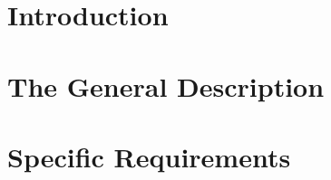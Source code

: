 \documentclass[12pt]{article}
\begin{document}

\begin{screen}
\ppttitle
\end{screen}
\footskip 0.7cm
\thispagestyle{empty} 
\pagetitle
\newpage
{}
\cfoot{\thepage}
\newpage
\tableofcontents
\newpage
{}
\cfoot{\thepage}
\newpage
{}
\section{Introduction}

\newpage
{}
\section{The General Description}

\newpage
{}
\section{Specific Requirements}

\end{document}
